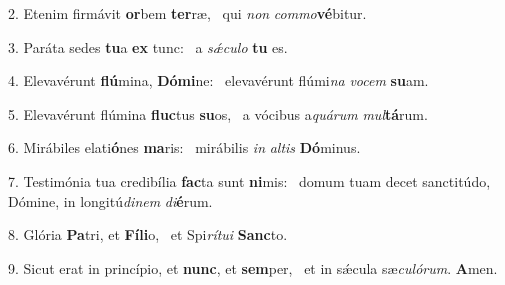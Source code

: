 2. Etenim firmávit \textbf{or}bem \textbf{ter}ræ, \ast\  qui \textit{non} \textit{com}\textit{mo}\textbf{vé}bitur.\

3. Paráta sedes \textbf{tu}a \textbf{ex} tunc: \ast\  a \textit{sǽ}\textit{cu}\textit{lo} \textbf{tu} es.\

4. Elevavérunt \textbf{flú}mina, \textbf{Dó}\textbf{mi}ne: \ast\  elevavérunt flúmi\textit{na} \textit{vo}\textit{cem} \textbf{su}am.\

5. Elevavérunt flúmina \textbf{fluc}tus \textbf{su}os, \ast\  a vócibus a\textit{quá}\textit{rum} \textit{mul}\textbf{tá}rum.\

6. Mirábiles elati\textbf{ó}nes \textbf{ma}ris: \ast\  mirábilis \textit{in} \textit{al}\textit{tis} \textbf{Dó}minus.\

7. Testimónia tua credibília \textbf{fac}ta sunt \textbf{ni}mis: \ast\  domum tuam decet sanctitúdo, Dómine, in longitú\textit{di}\textit{nem} \textit{di}\textbf{é}rum.\

8. Glória \textbf{Pa}tri, et \textbf{Fí}\textbf{li}o, \ast\  et Spi\textit{rí}\textit{tu}\textit{i} \textbf{Sanc}to.\

9. Sicut erat in princípio, et \textbf{nunc}, et \textbf{sem}per, \ast\  et in sǽcula sæ\textit{cu}\textit{ló}\textit{rum}. \textbf{A}men.\


